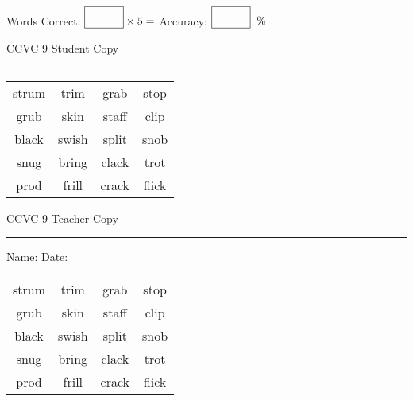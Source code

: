 \documentclass{memoir}
\begin{document}
\normalsize

Words Correct: $\fbox{\phantom{\huge 100}} \times 5 = $ Accuracy: $\fbox{\phantom{\huge 100}}\;\; \%$ 

\vfill

\newpage


\footnotesize \noindent
CCVC 9 \hfill Student Copy
\smallskip
\hrule

\Large

\setlength{\tabcolsep}{14pt}
\def\arraystretch{3}

{\selectfont


\begin{vplace}[0.5]
\begin{center}
\begin{tabular}{cccc}
strum & trim & grab                    & stop \\
grub & skin & staff            & clip \\
black            & swish & split & snob \\
snug & bring      & clack             & trot \\
prod & frill & crack       & flick            \\
\end{tabular}
\end{center}
\end{vplace}

}

\newpage

\footnotesize \noindent
CCVC 9 \hfill Teacher Copy
\smallskip
\hrule

\normalsize

\vfill

\noindent
Name: \underline{\hspace{1.75in}} \hfill Date: \underline{\hspace{1in}}

\Large

{\selectfont


\begin{vplace}[0.5]
\begin{center}
\begin{tabular}{cccc}
strum & trim & grab                    & stop \\
grub & skin & staff            & clip \\
black            & swish & split & snob \\
snug & bring      & clack             & trot \\
prod & frill & crack       & flick            \\
\end{tabular}
\end{center}
\end{vplace}



}
\end{document}
